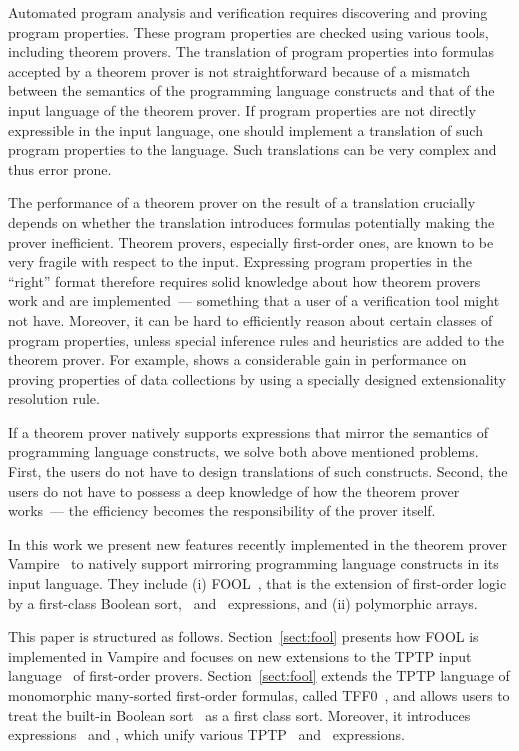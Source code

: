 Automated program analysis and verification requires discovering and proving program properties. These program properties are checked using various tools, including theorem provers. The translation of program properties into formulas accepted by a theorem prover is not straightforward because of a mismatch between the semantics of the programming language constructs and that of the input language of the theorem prover. If program properties are not directly expressible in the input language, one should implement a translation of such program properties to the language. Such translations can be very complex and thus error prone.

The performance of a theorem prover on the result of a translation crucially depends on whether the translation introduces formulas potentially making the prover inefficient. Theorem provers, especially first-order ones, are known to be very fragile with respect to the input. Expressing program properties in the ``right'' format therefore requires solid knowledge about how theorem provers work and are implemented~--- something that a user of a verification tool might not have. Moreover, it can be hard to efficiently reason about certain classes of program properties, unless special inference rules and heuristics are added to the theorem prover. For example, \cite{ATVA14} shows a considerable gain in performance on proving properties of data collections by using a specially designed extensionality resolution rule.

If a theorem prover natively supports expressions that mirror the semantics of programming language constructs, we solve both above mentioned problems. First, the users do not have to design translations of such constructs. Second, the users do not have to possess a deep knowledge of how the theorem prover works~--- the efficiency becomes the responsibility of the prover itself.

In this work we present new features recently implemented in the theorem prover Vampire~\cite{Vampire13} to natively support mirroring programming language constructs in its input language. They include (i) FOOL~\cite{FOOL}, that is the extension of first-order logic by a first-class Boolean sort, \ITE\ and \LETIN\ expressions, and (ii) polymorphic arrays.

This paper is structured as follows. Section~\ref{sect:fool} presents how FOOL is implemented in Vampire and focuses on new extensions to the TPTP input language~\cite{TPTP} of first-order provers. Section~\ref{sect:fool}  extends the TPTP language of monomorphic many-sorted first-order formulas, called TFF0~\cite{tff0}, and allows users to treat the built-in Boolean sort \tptpo\ as a first class sort. Moreover, it introduces expressions \dite\ and \dlet, which unify various TPTP \ITE\ and \LETIN\ expressions.

